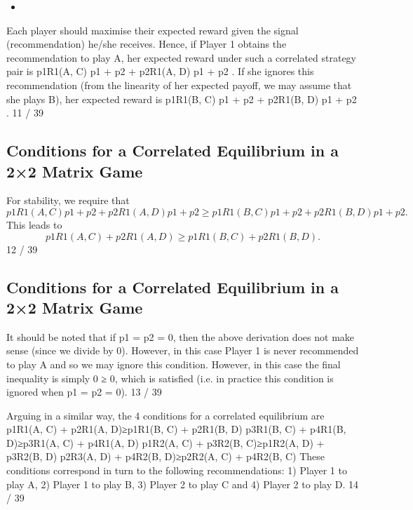 \documentclass[]{report}
\begin{document}
\begin{itemize}
	\item 
\end{itemize}
Each player should maximise their expected reward given the signal
(recommendation) he/she receives.
Hence, if Player 1 obtains the recommendation to play A, her
expected reward under such a correlated strategy pair is
p1R1(A, C)
p1 + p2
+
p2R1(A, D)
p1 + p2
.
If she ignores this recommendation (from the linearity of her
expected payoff, we may assume that she plays B), her expected
reward is
p1R1(B, C)
p1 + p2
+
p2R1(B, D)
p1 + p2
.
11 / 39

\subsection{Conditions for a Correlated Equilibrium in a 2×2 Matrix
Game}
For stability, we require that
\[p1R1(A, C)
p1 + p2
+
p2R1(A, D)
p1 + p2
≥
p1R1(B, C)
p1 + p2
+
p2R1(B, D)
p1 + p2
.\]
This leads to
\[p1R1(A, C) + p2R1(A, D) ≥ p1R1(B, C) + p2R1(B, D).\]
12 / 39

\subsection{Conditions for a Correlated Equilibrium in a 2×2 Matrix
Game}
It should be noted that if p1 = p2 = 0, then the above derivation
does not make sense (since we divide by 0).
However, in this case Player 1 is never recommended to play A and
so we may ignore this condition.
However, in this case the final inequality is simply 0 ≥ 0, which is
satisfied (i.e. in practice this condition is ignored when
p1 = p2 = 0).
13 / 39

Arguing in a similar way, the 4 conditions for a correlated
equilibrium are
p1R1(A, C) + p2R1(A, D)≥p1R1(B, C) + p2R1(B, D)
p3R1(B, C) + p4R1(B, D)≥p3R1(A, C) + p4R1(A, D)
p1R2(A, C) + p3R2(B, C)≥p1R2(A, D) + p3R2(B, D)
p2R3(A, D) + p4R2(B, D)≥p2R2(A, C) + p4R2(B, C)
These conditions correspond in turn to the following
recommendations: 1) Player 1 to play A, 2) Player 1 to play B, 3)
Player 2 to play C and 4) Player 2 to play D.
14 / 39
\end{document}
